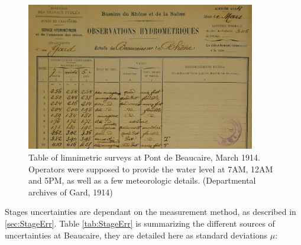 \documentclass[11pt]{article}
\begin{document}
        \begin{figure}[h]
            \centering
            \includegraphics[width = 10cm]{Figs/4-TabObsBcrSmall.jpg}
            \caption{Table of limnimetric surveys at Pont de Beaucaire, March 1914. Operators were supposed to provide the water level at 7AM, 12AM and 5PM, as well as a few meteorologic details. (Departmental archives of Gard, 1914)}
            \label{fig:TabObsPt}
        \end{figure}
        
    Stages uncertainties are dependant on the measurement method, as described in \ref{sec:StageErr}. Table \ref{tab:StageErr} is summarizing the different sources of uncertainties at Beaucaire, they are detailed here as standard deviations $\mu$:
    
\end{document}
